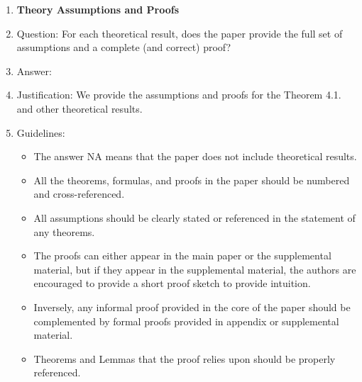 \documentclass{article}
\begin{document}
\begin{enumerate}
\item {\bf Theory Assumptions and Proofs}
    \item[] Question: For each theoretical result, does the paper provide the full set of assumptions and a complete (and correct) proof?
    \item[] Answer: \answerYes{} %
    \item[] Justification: We provide the assumptions and proofs for the Theorem 4.1. and other theoretical results. 
    \item[] Guidelines:
    \begin{itemize}
        \item The answer NA means that the paper does not include theoretical results. 
        \item All the theorems, formulas, and proofs in the paper should be numbered and cross-referenced.
        \item All assumptions should be clearly stated or referenced in the statement of any theorems.
        \item The proofs can either appear in the main paper or the supplemental material, but if they appear in the supplemental material, the authors are encouraged to provide a short proof sketch to provide intuition. 
        \item Inversely, any informal proof provided in the core of the paper should be complemented by formal proofs provided in appendix or supplemental material.
        \item Theorems and Lemmas that the proof relies upon should be properly referenced. 
    \end{itemize}


\end{enumerate}
\end{document}
